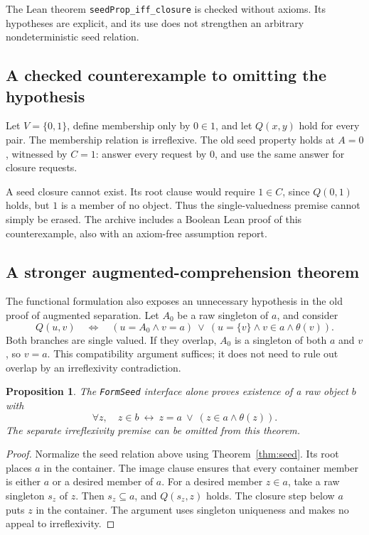 \documentclass[11pt,letterpaper]{article}
\newtheorem{proposition}[theorem]{Proposition}
\theoremstyle{definition}\newtheorem{definition}[theorem]{Definition}
\theoremstyle{remark}\newtheorem{remark}[theorem]{Remark}
\newcommand{\code}[1]{\texttt{\small #1}}
\begin{document}
The Lean theorem \code{seedProp\_iff\_closure} is checked without axioms. Its hypotheses are explicit, and its use does not strengthen an arbitrary nondeterministic seed relation.

\subsection{A checked counterexample to omitting the hypothesis}

Let $V=\{0,1\}$, define membership only by $0\in1$, and let $Q(x,y)$ hold for every pair. The membership relation is irreflexive. The old seed property holds at $A=0$, witnessed by $C=1$: answer every request by $0$, and use the same answer for closure requests.

A seed closure cannot exist. Its root clause would require $1\in C$, since $Q(0,1)$ holds, but $1$ is a member of no object. Thus the single-valuedness premise cannot simply be erased. The archive includes a Boolean Lean proof of this counterexample, also with an axiom-free assumption report.

\subsection{A stronger augmented-comprehension theorem}

The functional formulation also exposes an unnecessary hypothesis in the old proof of augmented separation. Let $A_0$ be a raw singleton of $a$, and consider
\[
 Q(u,v)\quad\Longleftrightarrow\quad
 (u=A_0\land v=a)\ \lor\
 (u=\{v\}\land v\in a\land\theta(v)).
\]
Both branches are single valued. If they overlap, $A_0$ is a singleton of both $a$ and $v$, so $v=a$. This compatibility argument suffices; it does not need to rule out overlap by an irreflexivity contradiction.

\begin{proposition}
The \code{FormSeed} interface alone proves existence of a raw object $b$ with
\[
 \forall z,\quad z\in b\ \leftrightarrow\ z=a\ \lor\ (z\in a\land\theta(z)).
\]
The separate irreflexivity premise can be omitted from this theorem.
\end{proposition}
\begin{proof}
Normalize the seed relation above using Theorem~\ref{thm:seed}. Its root places $a$ in the container. The image clause ensures that every container member is either $a$ or a desired member of $a$. For a desired member $z\in a$, take a raw singleton $s_z$ of $z$. Then $s_z\subseteq a$, and $Q(s_z,z)$ holds. The closure step below $a$ puts $z$ in the container. The argument uses singleton uniqueness and makes no appeal to irreflexivity.
\end{proof}
\end{document}
